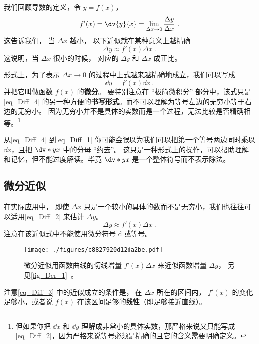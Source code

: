 
我们回顾导数的定义，令 $y = f(x)$，
\begin{equation}\label{eq_Diff_4}
f'(x) = \dv{y}{x} = \lim_{\Delta x\to 0} \frac{\Delta y}{\Delta x}~.
\end{equation}
这告诉我们， 当 $\Delta x$ 越小， 以下近似就在某种意义上越精确
\begin{equation}\label{eq_Diff_2}
\Delta y \approx f'(x) \Delta x~.
\end{equation}
这说明，当 $\Delta x$ 很小的时候， 对应的 $\Delta y$ 和 $\Delta x$ 成正比。

形式上，为了表示 $\Delta x\to 0$ 的过程中上式越来越精确地成立，我们可以写成
\begin{equation}\label{eq_Diff_1}
\dd{y} = f'(x)\dd{x}~.
\end{equation}
并把它叫做函数 $f(x)$ 的\textbf{微分}。 要特别注意在 “极简微积分” 部分中，该式只是\autoref{eq_Diff_4} 的另一种方便的\textbf{书写形式}。而不可以理解为等号左边的无穷小等于右边的无穷小。 因为无穷小并不是具体的实数而是一个过程，无法比较是否精确相等。\footnote{但如果你把 $\dd{x}$ 和 $\dd{y}$ 理解成非常小的具体实数，那严格来说又只能写成\autoref{eq_Diff_2}，因为严格来说等号必须是精确的且它的含义需要明确定义。}

从\autoref{eq_Diff_4} 到\autoref{eq_Diff_1} 你可能会误以为我们可以把第一个等号两边同时乘以 $\dd{x}$，且把 $\dv*{y}{x}$ 中的分母 “约去”。 这只是一种形式上的操作，可以帮助理解和记忆，但不能过度解读。毕竟 $\dv*{y}{x}$ 是一个整体符号而不表示除法。

\subsection{微分近似}\label{sub_Diff_1}

在实际应用中， 即使 $\Delta x$ 只是一个较小的具体的数而不是无穷小，我们也往往可以适用\autoref{eq_Diff_2} 来估计 $\Delta y$。
\begin{equation}\label{eq_Diff_3}
\Delta y \approx f'(x) \Delta x~.
\end{equation}
注意在该近似式中不能使用微分符号 $\mathrm{d}$ 或等号。

\begin{figure}[ht]
\centering
\texttt{[image: ./figures/c8827920d12da2be.pdf]}
\caption{微分近似用函数曲线的切线增量 $f'(x)\Delta x$ 来近似函数增量 $\Delta y$， 另见\autoref{fig_Der_1}~。} \label{fig_Diff_1}
\end{figure}
注意\autoref{eq_Diff_3} 中的近似成立的条件是， 在 $\Delta x$ 所在的区间内， $f'(x)$ 的变化足够小，或者说 $f(x)$ 在该区间足够的\textbf{线性}（即足够接近直线）。

